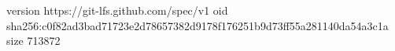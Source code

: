 version https://git-lfs.github.com/spec/v1
oid sha256:c0f82ad3bad71723e2d78657382d9178f176251b9d73ff55a281140da54a3c1a
size 713872
